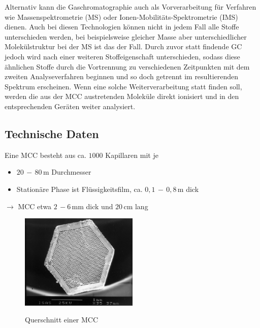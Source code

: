 Alternativ kann die Gaschromatographie auch als Vorverarbeitung für Verfahren wie Massenspektrometrie (MS) oder Ionen-Mobilitäts-Spektrometrie (IMS) dienen. Auch bei diesen Technologien können nicht in jedem Fall alle Stoffe unterschieden werden, bei beispielsweise gleicher Masse aber unterschiedlicher Molekülstruktur bei der MS ist das der Fall. Durch zuvor statt findende GC jedoch wird nach einer weiteren Stoffeigenschaft unterschieden, sodass diese ähnlichen Stoffe durch die Vortrennung zu verschiedenen Zeitpunkten mit dem zweiten Analyseverfahren beginnen und so doch getrennt im resultierenden Spektrum erscheinen. Wenn eine solche Weiterverarbeitung statt finden soll, werden die aus der MCC austretenden Moleküle direkt ionisiert und in den entsprechenden Geräten weiter analysiert.



\subsection{Technische Daten}
Eine MCC besteht aus ca. $1000$ Kapillaren mit je
\begin{itemize}
 \item $20\,-\,80$\,\textmu m Durchmesser
 \item Stationäre Phase ist Flüssigkeitsfilm, ca. $0,1\,-\,0,8$\,\textmu m dick
\end{itemize}
 
$\rightarrow$ MCC etwa $2\,-6$\,mm dick und $20$\,cm lang

\begin{figure}
 \centering
  \includegraphics[width = 0.5\textwidth]{bilder/MultiCapillaryColumn}\\
  \caption[Querschnitt einer MCC]{Querschnitt einer MCC \protect\footnotemark}
\end{figure}

